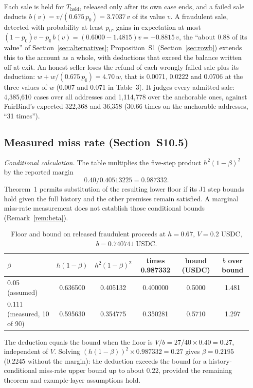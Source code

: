 \documentclass[10pt,a4paper]{article}
\newcommand{\Thold}{T_{\mathrm{hold}}}
\theoremstyle{plain}
\theoremstyle{remark}
\begin{document}
Each sale is held for $\Thold$, released only after its own case ends, and a failed sale deducts $b(v)=v/(0.675\,p_0)=3.7037\,v$ of its value $v$. A fraudulent sale, detected with probability at least $p_0$, gains in expectation at most $(1-p_0)v-p_0\,b(v)=(0.6000-1.4815)v=-0.8815\,v$, the ``about 0.88 of its value'' of Section~\ref{sec:alternatives}; Proposition~S1 (Section~\ref{sec:rowb}) extends this to the account as a whole, with deductions that exceed the balance written off at exit. An honest seller loses the refund of each wrongly failed sale plus its deduction: $w+w/(0.675\,p_0)=4.70\,w$, that is 0.0071, 0.0222 and 0.0706 at the three values of $w$ (0.007 and 0.071 in Table~3). It judges every admitted sale: 4,385,610 cases over all addresses and 1,114,778 over the anchorable ones, against FairBind's expected 322,368 and 36,358 (30.66 times on the anchorable addresses, ``31 times'').

\subsection{Measured miss rate (Section~S10.5)}

\emph{Conditional calculation.} The table multiplies the five-step product $h^2(1-\beta)^2$ by the reported margin
\[
0.40/0.40513225=0.987332.
\] Theorem~1 permits substitution of the resulting lower floor if its J1 step bounds hold given the full history and the other premises remain satisfied. A marginal miss-rate measurement does not establish those conditional bounds (Remark~\ref{rem:beta}).

\begin{table}[!htbp]
\centering
\caption{Floor and bound on released fraudulent proceeds at $h=0.67$, $V=0.2$ USDC, $b=0.740741$ USDC.}
\label{tab:beta}
\small
\begin{tabular}{@{}lccccc@{}}
\toprule
$\beta$ & $h(1-\beta)$ & $h^2(1-\beta)^2$ & times 0.987332 & bound (USDC) & $b$ over bound \\
\midrule
0.05 (assumed) & 0.636500 & 0.405132 & 0.400000 & 0.5000 & 1.481 \\
0.111 (measured, 10 of 90) & 0.595630 & 0.354775 & 0.350281 & 0.5710 & 1.297 \\
\bottomrule
\end{tabular}
\end{table}

The deduction equals the bound when the floor is $V/b=27/40\times0.40=0.27$, independent of $V$. Solving $(h(1-\beta))^2\times0.987332=0.27$ gives $\beta=0.2195$ (0.2245 without the margin): the deduction exceeds the bound for a history-conditional miss-rate upper bound up to about 0.22, provided the remaining theorem and example-layer assumptions hold.
\end{document}
